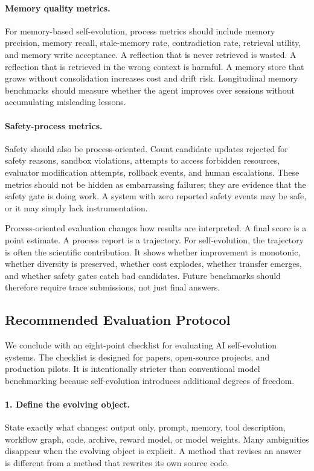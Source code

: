 \paragraph{Memory quality metrics.}
For memory-based self-evolution, process metrics should include memory precision, memory recall, stale-memory rate, contradiction rate, retrieval utility, and memory write acceptance. A reflection that is never retrieved is wasted. A reflection that is retrieved in the wrong context is harmful. A memory store that grows without consolidation increases cost and drift risk. Longitudinal memory benchmarks should measure whether the agent improves over sessions without accumulating misleading lessons.

\paragraph{Safety-process metrics.}
Safety should also be process-oriented. Count candidate updates rejected for safety reasons, sandbox violations, attempts to access forbidden resources, evaluator modification attempts, rollback events, and human escalations. These metrics should not be hidden as embarrassing failures; they are evidence that the safety gate is doing work. A system with zero reported safety events may be safe, or it may simply lack instrumentation.

Process-oriented evaluation changes how results are interpreted. A final score is a point estimate. A process report is a trajectory. For self-evolution, the trajectory is often the scientific contribution. It shows whether improvement is monotonic, whether diversity is preserved, whether cost explodes, whether transfer emerges, and whether safety gates catch bad candidates. Future benchmarks should therefore require trace submissions, not just final answers.

\subsection{Recommended Evaluation Protocol}
\label{subsec:recommended-evaluation-protocol}

We conclude with an eight-point checklist for evaluating AI self-evolution systems. The checklist is designed for papers, open-source projects, and production pilots. It is intentionally stricter than conventional model benchmarking because self-evolution introduces additional degrees of freedom.

\paragraph{1. Define the evolving object.}
State exactly what changes: output only, prompt, memory, tool description, workflow graph, code, archive, reward model, or model weights. Many ambiguities disappear when the evolving object is explicit. A method that revises an answer is different from a method that rewrites its own source code.

